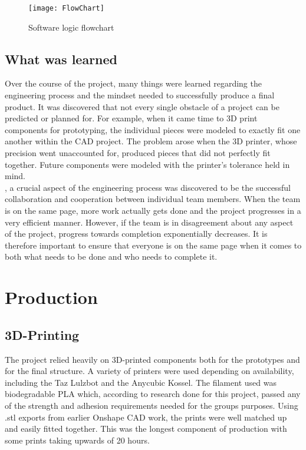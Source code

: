 \documentclass[12pt]{article}
\begin{document}
\begin{figure}[H]
\centering
    \texttt{[image: FlowChart]}
    \caption{Software logic flowchart}
    \label{fig:lucidchart}
\end{figure}

\subsection{What was learned}

Over the course of the project, many things were learned regarding the engineering process and the mindset needed to successfully produce a final product. It was discovered that not every single obstacle of a project can be predicted or planned for. For example, when it came time to 3D print components for prototyping, the individual pieces were modeled to exactly fit one another within the CAD project. The problem arose when the 3D printer, whose precision went unaccounted for, produced pieces that did not perfectly fit together. Future components were modeled with the printer's tolerance held in mind.\\
, a crucial aspect of the engineering process was discovered to be the successful collaboration and cooperation between individual team members. When the team is on the same page, more work actually gets done and the project progresses in a very efficient manner. However, if the team is in disagreement about any aspect of the project, progress towards completion exponentially decreases. It is therefore important to ensure that everyone is on the same page when it comes to both what needs to be done and who needs to complete it.  

\newpage
\section{Production}

\subsection{3D-Printing}
The project relied heavily on 3D-printed components both for the prototypes and for the final structure. A variety of printers were used depending on availability, including the Taz Lulzbot and the Anycubic Kossel. The filament used was biodegradable PLA which, according to research done for this project, passed any of the strength and adhesion requirements needed for the groups purposes. Using .stl exports from earlier Onshape CAD work, the prints were well matched up and easily fitted together. This was the longest component of production with some prints taking upwards of 20 hours.
\end{document}
